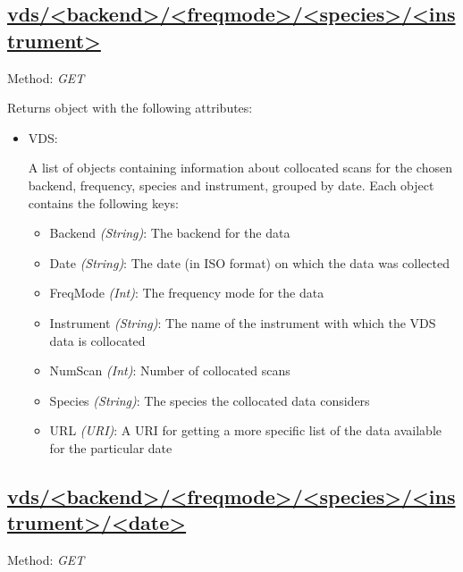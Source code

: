 \subsection{\url{vds/<backend>/<freqmode>/<species>/<instrument>}}
Method: \emph{GET}

Returns object with the following attributes:
\begin{itemize}
    \item VDS:

        A list of objects containing information about collocated scans for
        the chosen backend, frequency, species and instrument, grouped by date.
        Each object contains the following keys:

        \begin{itemize}
            \item Backend \emph{(String)}: The backend for the data
            \item Date \emph{(String)}: The date (in ISO format) on which the
                data was collected
            \item FreqMode \emph{(Int)}: The frequency mode for the data
            \item Instrument \emph{(String)}: The name of the instrument with
                which the VDS data is collocated
            \item NumScan \emph{(Int)}: Number of collocated scans
            \item Species \emph{(String)}: The species the collocated data
                considers
            \item URL \emph{(URI)}: A URI for getting a more specific list of
                the data available for the particular date
        \end{itemize}
\end{itemize}


\subsection{\url{vds/<backend>/<freqmode>/<species>/<instrument>/<date>}}
Method: \emph{GET}

